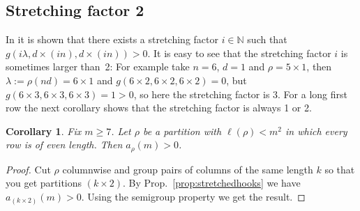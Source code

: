 \documentclass{article}
\numberwithin{equation}{section}
\newtheorem{corollary}[equation]{Corollary}
\theoremstyle{definition}
\def\la{\lambda}
\newcommand{\IN}{\mathbb N}
\begin{document}
\subsection{Stretching factor 2}
In \cite{bci:10} it is shown that there exists a stretching factor $i \in \IN$ such that
$g(i\la,d\times (in),d \times (in))>0$.
It is easy to see that the stretching factor $i$ is sometimes larger than~2:
For example take $n=6$, $d=1$ and $\rho=5 \times 1$, then $\la:=\rho(nd)=6 \times 1$ and $g(6 \times 2,6\times 2,6 \times 2)=0$,
but $g(6 \times 3,6\times 3,6 \times 3)=1>0$, so here the stretching factor is 3.
For a long first row the next corollary shows that the stretching factor is always 1 or 2.

\begin{corollary}\label{cor:even}
Fix $m \geq 7$. Let $\rho$ be a partition with $\ell(\rho)<m^2$ in which every row is of even length.
Then $a_\rho(m)>0$.
\end{corollary}
\begin{proof}
Cut $\rho$ columnwise and group pairs of columns of the same length $k$ so that you get partitions $(k \times 2)$.
By Prop.~\ref{prop:stretchedhooks} we have $a_{(k \times 2)}(m)>0$.
Using the semigroup property we get the result.
\end{proof}
\end{document}
